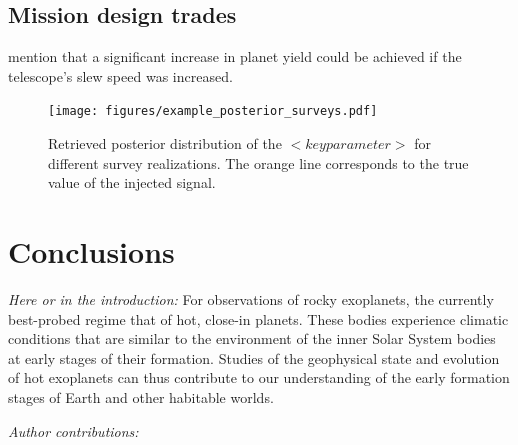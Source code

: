 \documentclass[modern]{aastex631}
\begin{document}
\subsection{Mission design trades}\label{sec:mission-design-trades}

\begin{note}
    \citet{Penny2019} mention that a significant increase in planet yield could be achieved if the telescope's slew speed was increased.
\end{note}

\begin{figure}[ht!]
    \begin{centering}

        \texttt{[image: figures/example\_posterior\_surveys.pdf]}
        \caption{
        Retrieved posterior distribution of the $<key parameter>$ for different survey realizations.
        The orange line corresponds to the true value of the injected signal.
        }
        \label{fig:posterior_surveys}
    \end{centering}
\end{figure}



\section{Conclusions}

\begin{note}
    \textit{Here or in the introduction:} For observations of rocky exoplanets, the currently best-probed regime that of hot, close-in planets.
    These bodies experience climatic conditions that are similar to the environment of the inner Solar System bodies at early stages of their formation.
    Studies of the geophysical state and evolution of hot exoplanets can thus contribute to our understanding of the early formation stages of Earth and other habitable worlds.
\end{note}



\begin{large}\textit{Author contributions:}\end{large}
\end{document}
